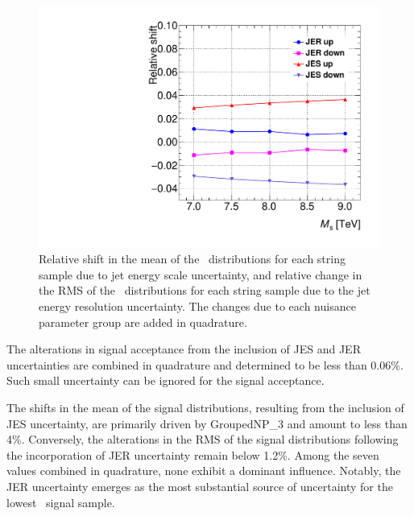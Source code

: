 \begin{figure}[htb]
\begin{center}
\includegraphics[width=0.65\linewidth]{fig/strings/JES_JER}
\end{center}
\caption{Relative shift in the mean of the \mjj\ distributions for each
string sample due to jet energy scale uncertainty, and relative change
in the RMS of the \mjj\ distributions for each string sample due to the
jet energy resolution uncertainty.
The changes due to each nuisance parameter group are added in
quadrature.}
\label{fig3}
\end{figure}

The alterations in signal acceptance from the inclusion of JES and JER uncertainties are
combined in quadrature and determined to be less than 0.06\%.  Such small uncertainty can be ignored for the signal
acceptance.


The shifts in the mean of the signal distributions, resulting from the inclusion of JES uncertainty, are primarily driven by GroupedNP\_3 and amount to less than 4\%.  Conversely, the alterations in the RMS of the signal distributions following the incorporation of JER uncertainty
remain below 1.2\%. Among the seven values combined in quadrature, none exhibit a dominant influence. Notably, the JER uncertainty emerges as the most substantial source of uncertainty for the lowest \Ms\ signal sample.


\FloatBarrier